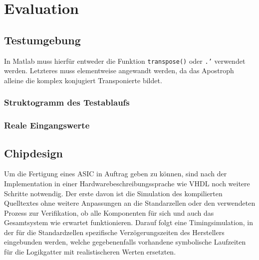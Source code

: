  
 






  
 \chapter{Evaluation}
 


 \section{Testumgebung}

In Matlab muss hierfür entweder die Funktion \texttt{transpose()} oder \texttt{.'} verwendet werden. Letzteres muss elementweise angewandt werden, da das Apostroph
alleine die komplex konjugiert Transponierte bildet.

 
 \subsection{Struktogramm des Testablaufs}
 \subsection{Reale Eingangswerte}
 
 \section{Chipdesign}
Um die Fertigung eines ASIC in Auftrag geben zu können, sind nach der Implementation in einer Hardwarebeschreibungssprache wie VHDL noch weitere Schritte notwendig.
Der erste davon ist die Simulation des kompilierten Quelltextes ohne weitere Anpassungen an die Standarzellen oder den verwendeten Prozess zur Verifikation, ob alle 
Komponenten für sich und auch das Gesamtsystem wie erwartet funktionieren.
Darauf folgt eine Timingsimulation, in der für die Standardzellen spezifische Verzögerungszeiten des Herstellers eingebunden werden, welche gegebenenfalls vorhandene 
symbolische Laufzeiten für die Logikgatter mit realistischeren Werten ersetzten.



 
